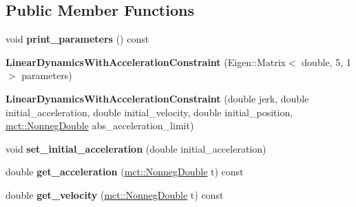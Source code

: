 \subsection*{Public Member Functions}
\begin{DoxyCompactItemize}
\item 
void {\bfseries print\+\_\+parameters} () const \hypertarget{classmct_1_1LinearDynamicsWithAccelerationConstraint_ade3a0d6eddf1a5af523270ae1fe13aca}{}\label{classmct_1_1LinearDynamicsWithAccelerationConstraint_ade3a0d6eddf1a5af523270ae1fe13aca}

\item 
{\bfseries Linear\+Dynamics\+With\+Acceleration\+Constraint} (Eigen\+::\+Matrix$<$ double, 5, 1 $>$ parameters)\hypertarget{classmct_1_1LinearDynamicsWithAccelerationConstraint_afe40d0fc5058e69055e0f4dbf59d611a}{}\label{classmct_1_1LinearDynamicsWithAccelerationConstraint_afe40d0fc5058e69055e0f4dbf59d611a}

\item 
{\bfseries Linear\+Dynamics\+With\+Acceleration\+Constraint} (double jerk, double initial\+\_\+acceleration, double initial\+\_\+velocity, double initial\+\_\+position, \hyperlink{classmct_1_1NonnegDouble}{mct\+::\+Nonneg\+Double} abs\+\_\+acceleration\+\_\+limit)\hypertarget{classmct_1_1LinearDynamicsWithAccelerationConstraint_a4501cf02cce687c60d6da0b24ef609d3}{}\label{classmct_1_1LinearDynamicsWithAccelerationConstraint_a4501cf02cce687c60d6da0b24ef609d3}

\item 
void {\bfseries set\+\_\+initial\+\_\+acceleration} (double initial\+\_\+acceleration)\hypertarget{classmct_1_1LinearDynamicsWithAccelerationConstraint_a8f9a83d5da9d9e7b9eb4031e43022dfe}{}\label{classmct_1_1LinearDynamicsWithAccelerationConstraint_a8f9a83d5da9d9e7b9eb4031e43022dfe}

\item 
double {\bfseries get\+\_\+acceleration} (\hyperlink{classmct_1_1NonnegDouble}{mct\+::\+Nonneg\+Double} t) const \hypertarget{classmct_1_1LinearDynamicsWithAccelerationConstraint_ad2691066026d0aa0e9c7867c98fc6685}{}\label{classmct_1_1LinearDynamicsWithAccelerationConstraint_ad2691066026d0aa0e9c7867c98fc6685}

\item 
double {\bfseries get\+\_\+velocity} (\hyperlink{classmct_1_1NonnegDouble}{mct\+::\+Nonneg\+Double} t) const \hypertarget{classmct_1_1LinearDynamicsWithAccelerationConstraint_a75b2c052e49a8b591b29df9551f05614}{}\label{classmct_1_1LinearDynamicsWithAccelerationConstraint_a75b2c052e49a8b591b29df9551f05614}


\end{DoxyCompactItemize}
